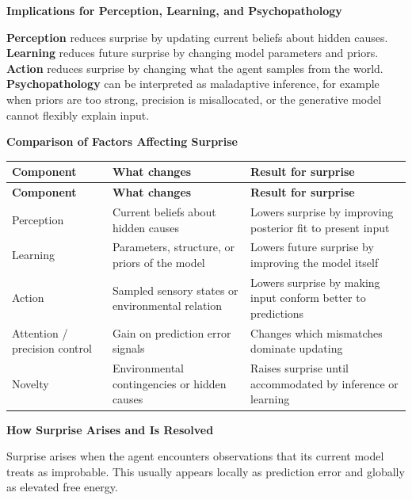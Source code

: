\documentclass{book}
\providecommand{\ProjectDeepHeading}[2]{%
    \par\medskip\noindent\textbf{#2}\par\smallskip
}
\begin{document}
    
    \ProjectDeepHeading{13}{Implications for Perception, Learning, and Psychopathology}
        \textbf{Perception} reduces surprise by updating current beliefs about hidden causes.\newline
        \textbf{Learning} reduces future surprise by changing model parameters and priors.\newline
        \textbf{Action} reduces surprise by changing what the agent samples from the world.\newline
        \textbf{Psychopathology} can be interpreted as maladaptive inference, for example when priors are too strong, precision is misallocated, or the generative model cannot flexibly explain input.
    
    
    \ProjectDeepHeading{13}{Comparison of Factors Affecting Surprise}
        \begin{longtable}{>{\raggedright\arraybackslash}p{3.0cm} >{\raggedright\arraybackslash}p{5.0cm} >{\raggedright\arraybackslash}p{5.2cm}}
            \toprule
            \rowcolor{gray!15}
            \textbf{Component} & \textbf{What changes} & \textbf{Result for surprise} \\
            \midrule
            \endfirsthead
            \toprule
            \rowcolor{gray!15}
            \textbf{Component} & \textbf{What changes} & \textbf{Result for surprise} \\
            \midrule
            \endhead
            Perception & Current beliefs about hidden causes & Lowers surprise by improving posterior fit to present input \\
            Learning & Parameters, structure, or priors of the model & Lowers future surprise by improving the model itself \\
            Action & Sampled sensory states or environmental relation & Lowers surprise by making input conform better to predictions \\
            Attention / precision control & Gain on prediction error signals & Changes which mismatches dominate updating \\
            Novelty & Environmental contingencies or hidden causes & Raises surprise until accommodated by inference or learning \\
            \bottomrule
        \end{longtable}
    
    
    \ProjectDeepHeading{13}{How Surprise Arises and Is Resolved}
        Surprise arises when the agent encounters observations that its current model treats as improbable. This usually appears locally as prediction error and globally as elevated free energy.
        
\end{document}
